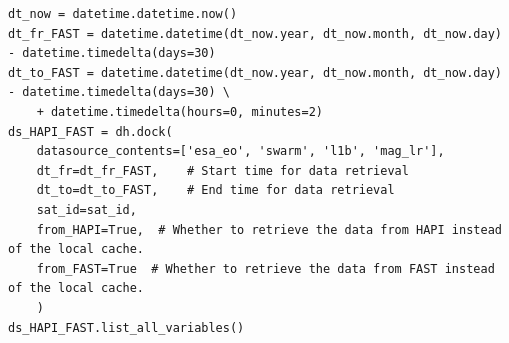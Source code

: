 \begin{verbatim}
dt_now = datetime.datetime.now()
dt_fr_FAST = datetime.datetime(dt_now.year, dt_now.month, dt_now.day) - datetime.timedelta(days=30)
dt_to_FAST = datetime.datetime(dt_now.year, dt_now.month, dt_now.day) - datetime.timedelta(days=30) \
    + datetime.timedelta(hours=0, minutes=2)
ds_HAPI_FAST = dh.dock(
    datasource_contents=['esa_eo', 'swarm', 'l1b', 'mag_lr'], 
    dt_fr=dt_fr_FAST,    # Start time for data retrieval
    dt_to=dt_to_FAST,    # End time for data retrieval
    sat_id=sat_id,
    from_HAPI=True,  # Whether to retrieve the data from HAPI instead of the local cache. 
    from_FAST=True  # Whether to retrieve the data from FAST instead of the local cache.
    )
ds_HAPI_FAST.list_all_variables()
\end{verbatim}

